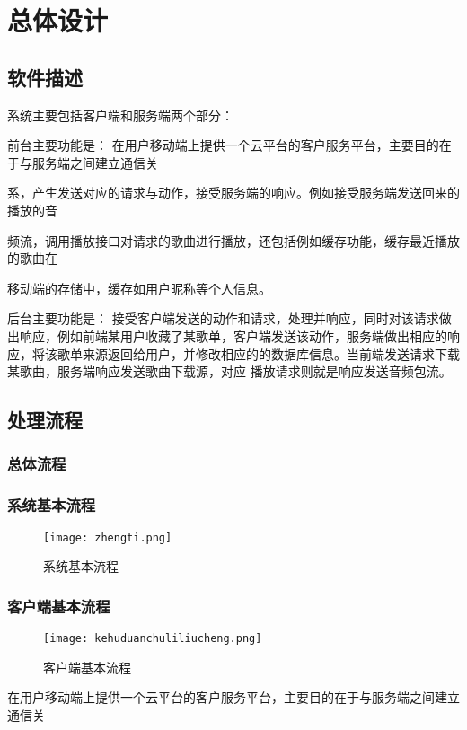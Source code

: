 \chapter{总体设计}
\section{软件描述}
系统主要包括客户端和服务端两个部分：

前台主要功能是：
在用户移动端上提供一个云平台的客户服务平台，主要目的在于与服务端之间建立通信关

系，产生发送对应的请求与动作，接受服务端的响应。例如接受服务端发送回来的播放的音

频流，调用播放接口对请求的歌曲进行播放，还包括例如缓存功能，缓存最近播放的歌曲在

移动端的存储中，缓存如用户昵称等个人信息。


后台主要功能是：
接受客户端发送的动作和请求，处理并响应，同时对该请求做出响应，例如前端某用户收藏了某歌单，客户端发送该动作，服务端做出相应的响应，将该歌单来源返回给用户，并修改相应的的数据库信息。当前端发送请求下载某歌曲，服务端响应发送歌曲下载源，对应 播放请求则就是响应发送音频包流。


\section{处理流程}
\subsection{总体流程}


\subsection{系统基本流程}

\begin{figure}[H]
	\centering
	\texttt{[image: zhengti.png]}
	\caption{系统基本流程} 
	\label{fig:figure8s}
\end{figure}

\subsection{客户端基本流程}
\begin{figure}[H]
	\centering
	\texttt{[image: kehuduanchuliliucheng.png]}
	\caption{客户端基本流程} 
	\label{fig:figure8d}
\end{figure}

在用户移动端上提供一个云平台的客户服务平台，主要目的在于与服务端之间建立通信关

